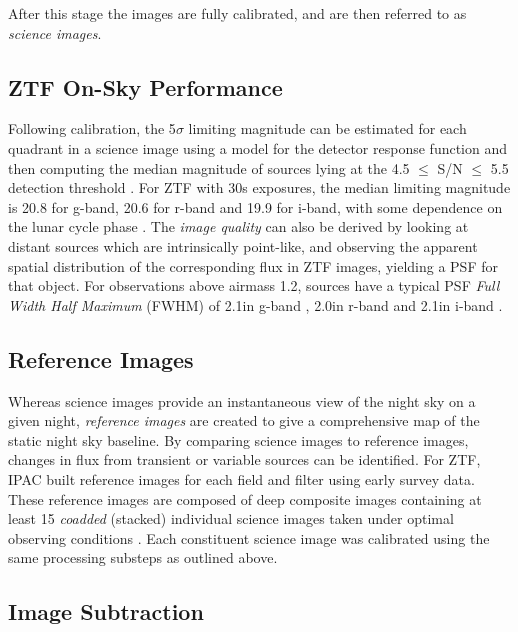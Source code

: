 After this stage the images are fully calibrated, and are then referred to as \emph{science images}. 

\subsection*{ZTF On-Sky Performance}

Following calibration, the 5$\sigma$ limiting magnitude can be estimated for each quadrant in a science image using a model for the detector response function and then computing the median magnitude of sources lying at the 4.5 $\leq$ S/N $\leq$ 5.5 detection threshold \cite{ztf_data_processing}. For ZTF with 30s exposures, the median limiting magnitude is 20.8 for g-band, 20.6 for r-band and 19.9 for i-band, with some dependence on the lunar cycle phase \cite{ztf_system}. The \emph{image quality} can also be derived by looking at distant sources which are intrinsically point-like, and observing the apparent spatial distribution of the corresponding flux in ZTF images, yielding a  PSF for that object. For observations above airmass 1.2, sources have a typical PSF \emph{Full Width Half Maximum} (FWHM) of 2.1\arcsec in g-band , 2.0\arcsec in r-band and 2.1\arcsec in i-band \cite{ztf_system}.

\subsection*{Reference Images}

Whereas science images provide an instantaneous view of the night sky on a given night, \emph{reference images} are created to give a comprehensive map of the static night sky baseline. By comparing science images to reference images, changes in flux from transient or variable sources can be identified. For ZTF, IPAC built reference images for each field and filter using early survey data. These reference images are composed of deep composite images containing at least 15 \emph{coadded} (stacked) individual science images taken under optimal observing conditions \cite{ztf_data_processing}. Each constituent science image was calibrated using the same processing substeps as outlined above.

\subsection*{Image Subtraction}

